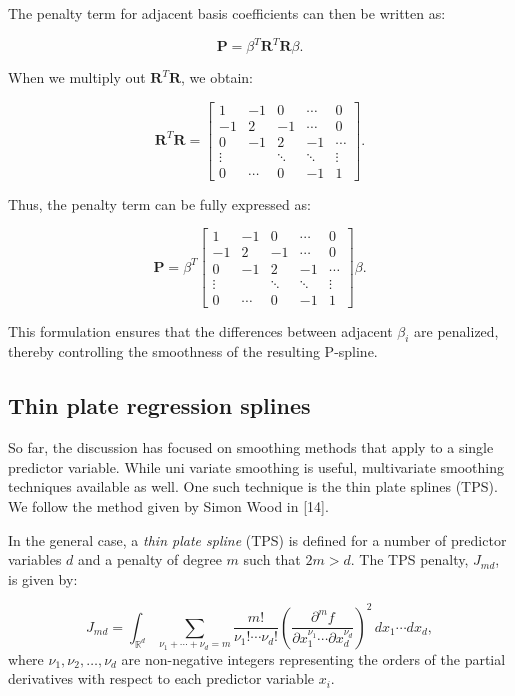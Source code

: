 \documentclass[
11pt, %
oneside, %
english, %
singlespacing, %
]{macthesis} %
\begin{document}
The penalty term for adjacent basis coefficients can then be written as:

\[
\mathbf{P} = \beta^T \mathbf{R}^T \mathbf{R} \beta.
\]

When we multiply out \(\mathbf{R}^T \mathbf{R}\), we obtain:

\[
\mathbf{R}^T \mathbf{R} = \begin{bmatrix}
1 & -1 & 0 & \cdots & 0 \\
-1 & 2 & -1 & \cdots & 0 \\
0 & -1 & 2 & -1 & \cdots \\
\vdots & & \ddots & \ddots & \vdots \\
0 & \cdots & 0 & -1 & 1 
\end{bmatrix}.
\]

Thus, the penalty term can be fully expressed as:

\[
\mathbf{P} = \beta^T
\begin{bmatrix}
1 & -1 & 0 & \cdots & 0 \\
-1 & 2 & -1 & \cdots & 0 \\
0 & -1 & 2 & -1 & \cdots \\
\vdots & & \ddots & \ddots & \vdots \\
0 & \cdots & 0 & -1 & 1 
\end{bmatrix}
\beta.
\]

This formulation ensures that the differences between adjacent \(\beta_i\) are penalized, thereby controlling the smoothness of the resulting P-spline.

\subsection{Thin plate regression splines}\label{Thin-plate-regression-splines}

So far, the discussion has focused on smoothing methods that apply to a single predictor variable. While uni variate smoothing is useful, multivariate smoothing techniques available as well. One such technique is the thin plate splines (TPS). We follow the method given by Simon Wood in {[}14{]}.

In the general case, a \emph{thin plate spline} (TPS) is defined for a number of predictor variables \(d\) and a penalty of degree \(m\) such that \(2m > d\). The TPS penalty, \(J_{md}\), is given by:

\[
J_{md} = \int_{\mathbb{R}^d} \sum_{\nu_1 + \cdots + \nu_d = m} \frac{m!}{\nu_1! \cdots \nu_d!} \left( \frac{\partial^m f}{\partial x_1^{\nu_1} \cdots \partial x_d^{\nu_d}} \right)^2 \, dx_1 \cdots dx_d,
\]
where \(\nu_1, \nu_2, \ldots, \nu_d\) are non-negative integers representing the orders of the partial derivatives with respect to each predictor variable \(x_i\).
\end{document}
